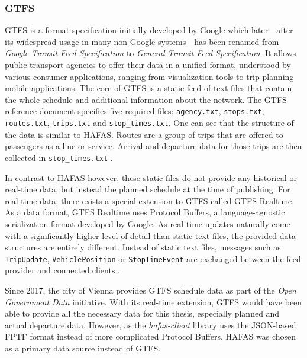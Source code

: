 \subsubsection{\acf{GTFS}}

\ac{GTFS} is a format specification initially developed by Google which later---after its widespread usage in many non-Google systems---has been renamed from \textit{Google Transit Feed Specification} to \textit{General Transit Feed Specification}. It allows public transport agencies to offer their data in a unified format, understood by various consumer applications, ranging from visualization tools to trip-planning mobile applications. The core of \ac{GTFS} is a static feed of text files that contain the whole schedule and additional information about the network. The \ac{GTFS} reference document specifies five required files: \texttt{agency.txt}, \texttt{stops.txt}, \texttt{routes.txt}, \texttt{trips.txt} and \texttt{stop\_times.txt}. One can see that the structure of the data is similar to \ac{HAFAS}. Routes are a group of trips that are offered to passengers as a line or service. Arrival and departure data for those trips are then collected in \texttt{stop\_times.txt} \autocite{gtfs-2022-schedule}.

In contrast to \ac{HAFAS} however, these static files do not provide any historical or real-time data, but instead the planned schedule at the time of publishing. For real-time data, there exists a special extension to \ac{GTFS} called \ac{GTFS} Realtime. As a data format, \ac{GTFS} Realtime uses Protocol Buffers, a language-agnostic serialization format developed by Google. As real-time updates naturally come with a significantly higher level of detail than static text files, the provided data structures are entirely different. Instead of static text files, messages such as \texttt{TripUpdate}, \texttt{VehiclePosition} or \texttt{StopTimeEvent} are exchanged between the feed provider and connected clients \autocite{gtfs-2022-realtime}. 

Since 2017, the city of Vienna provides \ac{GTFS} schedule data as part of the \textit{Open Government Data} initiative. With its real-time extension, \ac{GTFS} would have been able to provide all the necessary data for this thesis, especially planned and actual departure data. However, as the \textit{hafas-client} library uses the \ac{JSON}-based \ac{FPTF} format instead of more complicated Protocol Buffers, \ac{HAFAS} was chosen as a primary data source instead of \ac{GTFS}.